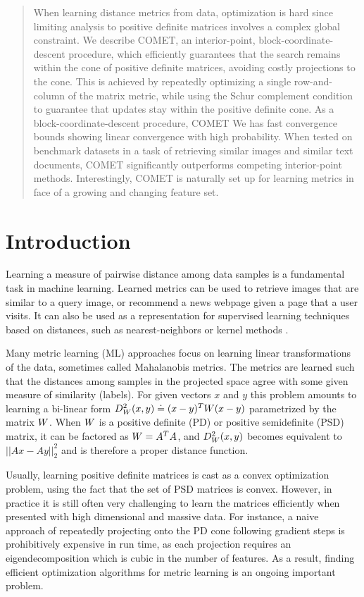 \documentclass{article}
\begin{document}

\begin{abstract} 
When learning distance metrics from data, optimization is hard since limiting analysis to positive definite matrices involves a complex global constraint. We describe COMET, an interior-point, block-coordinate-descent procedure, which efficiently guarantees that the search remains within the cone of positive definite matrices, avoiding costly projections to the cone. 
This is achieved by repeatedly optimizing a single row-and-column of the matrix metric, while using the Schur complement condition to guarantee that updates stay within the positive definite cone. As a block-coordinate-descent procedure, COMET We has fast convergence bounds showing linear convergence with high probability. When tested on benchmark datasets in a task of retrieving similar images and similar text documents, COMET significantly outperforms competing interior-point methods. Interestingly, COMET is naturally set up for learning metrics in face of a growing and changing feature set.
\end{abstract} 

\section{Introduction}
Learning a measure of pairwise distance among data samples is a fundamental task in machine learning. Learned metrics can be used to retrieve images that are similar to a query image, or recommend a news webpage given a page that a user visits. It can also be used as a representation for supervised learning techniques based on distances, such as nearest-neighbors or kernel methods \cite{kulis2012survey}. 

Many metric learning (ML) approaches focus on learning linear transformations of the data, sometimes called Mahalanobis metrics. The metrics are learned such that the distances among samples in the projected space agree with some given measure of similarity (labels). For given vectors $x$ and $y$ this problem amounts to learning a bi-linear form  $D^2_{{W}}(x,y) \doteq (x-y)^T{W}(x-y)$ parametrized by the matrix ${W}$. When ${W}$ is a positive definite (PD) or positive semidefinite (PSD) matrix, it can be factored as ${W}=A^TA$,  and $D^2_{{W}}(x,y)$ becomes equivalent to $||Ax-Ay||^2_2$ and is therefore a proper distance function.

Usually, learning positive definite matrices is cast as a convex optimization problem, using the fact that the set of PSD matrices is convex. However, in practice it is still often very challenging to learn the matrices efficiently when presented with high dimensional and massive data. For instance, a naive approach of repeatedly projecting onto the PD cone following gradient steps is prohibitively expensive in run time, as each projection requires an eigendecomposition which is cubic in the number of features. As a result, finding efficient optimization algorithms for metric learning is an ongoing important problem.
\end{document}
